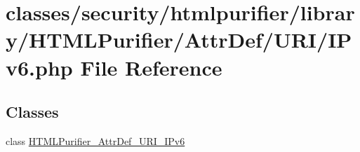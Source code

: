 \hypertarget{IPv6_8php}{\section{classes/security/htmlpurifier/library/\+H\+T\+M\+L\+Purifier/\+Attr\+Def/\+U\+R\+I/\+I\+Pv6.php File Reference}
\label{IPv6_8php}
}
\subsection*{Classes}
\begin{DoxyCompactItemize}
\item 
class \hyperlink{classHTMLPurifier__AttrDef__URI__IPv6}{H\+T\+M\+L\+Purifier\+\_\+\+Attr\+Def\+\_\+\+U\+R\+I\+\_\+\+I\+Pv6}
\end{DoxyCompactItemize}
